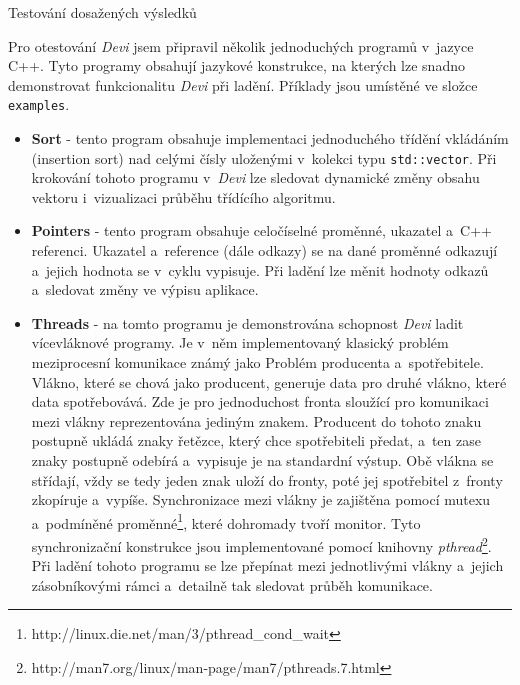 \documentclass[czech,bachelor,male,python,dept460,hidelinks]{diploma}						%
\newcommand{\parspace}[1][]{
	\ifthenelse{\isempty{#1}}{\vspace{0mm}}{\vspace{#1}}
	\par
}
\begin{document}
\begin{section}{Testování dosažených výsledků}
	\parspace Pro otestování \textit{Devi} jsem připravil několik jednoduchých programů v~jazyce C++. Tyto programy obsahují jazykové konstrukce, na kterých
	lze snadno demonstrovat funkcionalitu \textit{Devi} při ladění. Příklady jsou umístěné ve složce \texttt{examples}.
	
	\begin{itemize}
		\item \textbf{Sort} - tento program obsahuje implementaci jednoduchého třídění vkládáním (insertion sort) nad celými čísly uloženými v~kolekci
		typu \texttt{std::vector}. Při krokování tohoto programu v~\textit{Devi} lze sledovat dynamické změny obsahu vektoru i~vizualizaci průběhu třídícího
		algoritmu.
		\item \textbf{Pointers} - tento program obsahuje celočíselné proměnné, ukazatel a~C++ referenci. Ukazatel a~reference (dále odkazy) se na dané proměnné
		odkazují a~jejich hodnota se v~cyklu vypisuje. Při ladění lze měnit hodnoty odkazů a~sledovat změny ve výpisu aplikace.
		\item \textbf{Threads} - na tomto programu je demonstrována schopnost \textit{Devi} ladit vícevláknové programy. Je v~něm implementovaný
		klasický problém meziprocesní komunikace známý jako Problém producenta a~spotřebitele. \cite[76]{tanenbaum} Vlákno, které se chová jako producent, generuje
		data pro druhé vlákno, které data spotřebovává. Zde je pro jednoduchost fronta sloužící pro komunikaci mezi vlákny reprezentována jediným znakem.
		Producent do tohoto znaku postupně ukládá znaky řetězce, který chce spotřebiteli předat, a~ten zase znaky postupně odebírá a~vypisuje je na standardní výstup.
		Obě vlákna se střídají, vždy se tedy jeden znak uloží do fronty, poté jej spotřebitel z~fronty zkopíruje a~vypíše. Synchronizace mezi vlákny je
		zajištěna pomocí mutexu a~podmíněné proměnné\footnote{http://linux.die.net/man/3/pthread\_cond\_wait}, které dohromady tvoří monitor.
		\cite[81]{tanenbaum} Tyto synchronizační konstrukce jsou implementované pomocí knihovny
		\textit{pthread}\footnote{http://man7.org/linux/man-page/man7/pthreads.7.html}. Při ladění tohoto programu se lze přepínat mezi jednotlivými vlákny
		a~jejich zásobníkovými rámci a~detailně tak sledovat průběh komunikace.
	\end{itemize}
\end{section}
\end{document}
